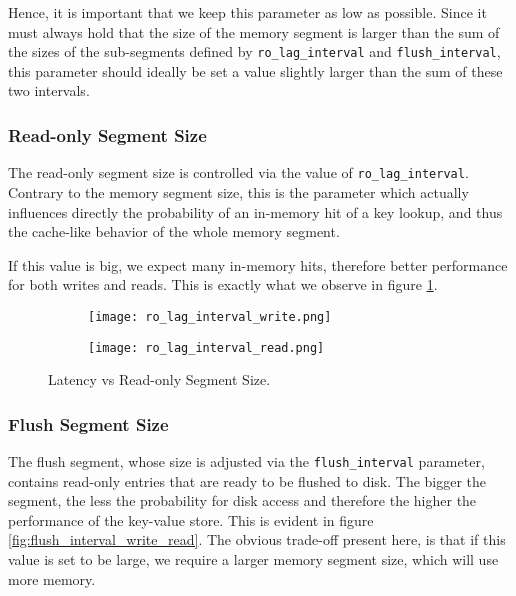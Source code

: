 Hence, it is important that we keep this parameter as low as possible. Since it must always hold that the size of the memory segment is larger than the sum of the sizes of the sub-segments defined by \verb"ro_lag_interval" and \verb"flush_interval", this parameter should ideally be set a value slightly larger than the sum of these two intervals.

\subsubsection{Read-only Segment Size}

The read-only segment size is controlled via the value of \verb"ro_lag_interval". Contrary to the memory segment size, this is the parameter which actually influences directly the probability of an in-memory hit of a key lookup, and thus the cache-like behavior of the whole memory segment.

If this value is big, we expect many in-memory hits, therefore better performance for both writes and reads. This is exactly what we observe in figure \ref{fig:ro_lag_interval}.

\begin{figure}[h]
    \begin{subfigure}{.5\textwidth}
        \centering
        \texttt{[image: ro\_lag\_interval\_write.png]}
    \end{subfigure}
    \begin{subfigure}{.5\textwidth}
        \centering
        \texttt{[image: ro\_lag\_interval\_read.png]}
    \end{subfigure}
    \caption{Latency vs Read-only Segment Size.}
    \label{fig:ro_lag_interval}
\end{figure}

\subsubsection{Flush Segment Size}

The flush segment, whose size is adjusted via the \verb"flush_interval" parameter, contains read-only entries that are ready to be flushed to disk. The bigger the segment, the less the probability for disk access and therefore the higher the performance of the key-value store. This is evident in figure \ref{fig:flush_interval_write_read}. The obvious trade-off present here, is that if this value is set to be large, we require a larger memory segment size, which will use more memory.


